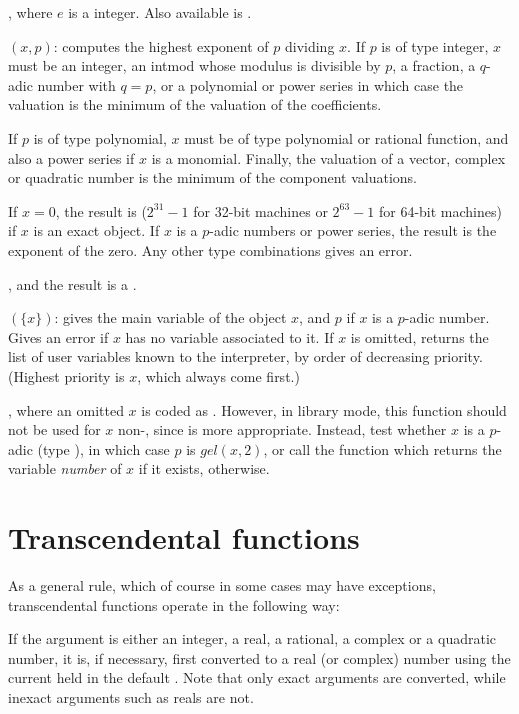 , where $e$ is a  integer. Also available is
.

$(x,p)$:\label{se:valuation} computes the highest
exponent of $p$ dividing $x$. If $p$ is of type integer, $x$ must be an
integer, an intmod whose modulus is divisible by $p$, a fraction, a
$q$-adic number with $q=p$, or a polynomial or power series in which case the
valuation is the minimum of the valuation of the coefficients.

If $p$ is of type polynomial, $x$ must be of type polynomial or rational
function, and also a power series if $x$ is a monomial. Finally, the
valuation of a vector, complex or quadratic number is the minimum of the
component valuations.

If $x=0$, the result is  ($2^{31}-1$ for 32-bit machines or
$2^{63}-1$ for 64-bit machines) if $x$ is an exact object. If $x$ is a
$p$-adic numbers or power series, the result is the exponent of the zero.
Any other type combinations gives an error.

, and the result is a .

$(\{x\})$: gives the main variable of the object $x$, and
$p$ if $x$ is a $p$-adic number. Gives an error if $x$ has no variable
associated to it. If $x$ is omitted, returns the list of user variables known
to the interpreter, by order of decreasing priority. (Highest priority is $x$,
which always come first.)

, where an omitted $x$ is coded as .
However, in library mode, this function should not be used for $x$
non-, since  is more appropriate. Instead, test whether
$x$ is a $p$-adic (type ), in which case $p$ is $gel(x,2)$, or call
the function  which returns the variable \emph{number} of $x$ if
it exists,  otherwise.

\section{Transcendental functions}\label{se:trans}

As a general rule, which of course in some cases may have exceptions,
transcendental functions operate in the following way:

\item If the argument is either an integer, a real, a rational, a complex
or a quadratic number, it is, if necessary, first converted to a real (or
complex) number using the current  held in the default
. Note that only exact arguments are converted, while
inexact arguments such as reals are not.

